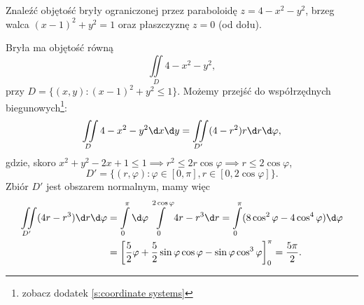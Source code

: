\begin{example}
    Znaleźć objętość bryły ograniczonej przez paraboloidę $z = 4 - x^2 - y^2$, brzeg walca $(x - 1)^2 + y^2 = 1$ oraz płaszczyznę $z = 0$ (od dołu).
\end{example}
\begin{solution}
    Bryła ma objętość równą
    \[ \iint\limits_{D} 4 - x^2 - y^2, \]
    przy $D = \{(x, y) : (x - 1)^2 + y^2 \leq 1\}$. Możemy przejść do współrzędnych biegunowych\footnote{zobacz dodatek \ref{s:coordinate systems}}:
    \[ \iint\limits_{D} 4 - x^2 - y^2 \d x \d y = \iint\limits_{D'} (4 - r^2) r \d r \d \varphi, \]
    gdzie, skoro $x^2 + y^2 - 2x + 1 \leq 1 \implies r^2 \leq 2r\cos\varphi \implies r \leq 2\cos\varphi$,
    \[ D' = \{(r, \varphi) : \varphi \in [0, \pi], r \in [0, 2\cos\varphi] \}. \]
    Zbiór $D'$ jest obszarem normalnym, mamy więc
    \begin{align*}
        \iint\limits_{D'} (4r - r^3) \d r \d \varphi &= \int\limits_0^\pi \d \varphi \int\limits_0^{2\cos\varphi} 4r - r^3 \d r = \int\limits_0^\pi (8\cos^2\varphi - 4\cos^4\varphi) \d \varphi \\
        &= \left[\frac{5}{2}\varphi + \frac{5}{2}\sin\varphi\cos\varphi - \sin\varphi\cos^3\varphi\right]_0^\pi = \frac{5\pi}{2}.
    \end{align*}
\end{solution}